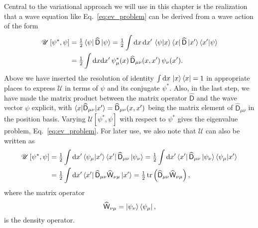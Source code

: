 Central to the variational approach we will use in this chapter is the realization that
a wave equation like Eq.~\eqref{eq:ev_problem} can be derived from a wave action of the form
%
\begin{equation}
  \begin{aligned}
    \mathscr{U}\left[\psi^{*}, \psi\right] &= \tfrac{1}{2}\mathinner{\langle{\psi}\rvert}\widehat{\mathsf{D}}\mathinner{\lvert{\psi}\rangle}
  = \tfrac{1}{2}\int \mathrm{d}{x}\,\mathrm{d}{x'}\, \mathinner{\langle{\psi|x}\rangle}\mathinner{\langle{x}\rvert}\widehat{\mathsf{D}}\mathinner{\lvert{x'}\rangle}\mathinner{\langle{x'|\psi}\rangle}\\
                                           &= \tfrac{1}{2}\int \mathrm{d}{x}\mathrm{d}{x'}\, \psi^{*}_{\mu}(x)\,\widehat{\mathsf{D}}_{\mu\nu}(x, x')\,\psi_{\nu}(x').
  \label{eq:wave_action}
  \end{aligned}
\end{equation}
%
Above we have inserted the resolution of identity $\int \mathrm{d}{x}\,\mathinner{\lvert{x}\rangle}\mathinner{\langle{x}\rvert} = 1$ in appropriate places to express $\mathscr{U}$ in terms of $\psi$ and its conjugate $\psi^{*}$.
Also, in the last step, we have made the matrix product between the matrix operator $\widehat{\mathsf{D}}$ and the wave vector $\psi$ explicit, with $\mathinner{\langle{x|\widehat{\mathsf{D}}_{\mu\nu}|x'}\rangle} = \widehat{\mathsf{D}}_{\mu\nu}(x, x')$ being the matrix element of $\widehat{\mathsf{D}}_{\mu\nu}$ in the position basis.
Varying $\mathscr{U}[\psi^{*}, \psi]$ with respect to $\psi^{*}$ gives the eigenvalue problem, Eq.~\eqref{eq:ev_problem}.
For later use, we also note that $\mathscr{U}$ can also be written as
%
\begin{equation}
  \begin{aligned}
    \mathscr{U}\left[\psi^{*}, \psi\right] &= \tfrac{1}{2}\int \mathrm{d}{x}' \mathinner{\langle{\psi_{\mu}|x'}\rangle}\mathinner{\langle{x'}\rvert}\widehat{\mathsf{D}}_{\mu\nu}\mathinner{\lvert{\psi_{\nu}}\rangle}
= \tfrac{1}{2}\int \mathrm{d}{x}' \mathinner{\langle{x'}\rvert}\widehat{\mathsf{D}}_{\mu\nu}\mathinner{\lvert{\psi_{\nu}}\rangle} \mathinner{\langle{\psi_{\mu}|x'}\rangle}\\
&= \tfrac{1}{2}\int \mathrm{d}{x}' \mathinner{\langle{x'}\rvert}\widehat{\mathsf{D}}_{\mu\nu}\widehat{\mathsf{W}}_{\nu\mu}\mathinner{\lvert{x'}\rangle} = \tfrac{1}{2}\operatorname{tr}\left(\widehat{\mathsf{D}}_{\mu\nu}\widehat{\mathsf{W}}_{\nu\mu}\right),
  \label{eq:wave_action_trace_form}
  \end{aligned}
\end{equation}
%
where the matrix operator
%
\begin{equation}
  \widehat{\mathsf{W}}_{\nu\mu} = \mathinner{\lvert{\psi_{\nu}}\rangle}\mathinner{\langle{\psi_{\mu}}\rvert},
\end{equation}
%
is the density operator.

